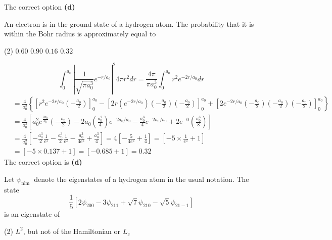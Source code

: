 \begin{enumerate}
\begin{answer}
	The correct option \textbf{(d)}	
\end{answer}
\begin{minipage}{\textwidth}
	\item An electron is in the ground state of a hydrogen atom. The probability that it is within the Bohr radius is approximately equal to
\end{minipage}
\begin{tasks}(2)
	\task[\textbf{A.}] $0.60$
	\task[\textbf{B.}] $0.90$
	\task[\textbf{C.}]$0.16$
	\task[\textbf{D.}]$0.32$
\end{tasks}
\begin{answer}
	$$\int_{0}^{a_{0}}\left|\frac{1}{\sqrt{\pi a_{0}^{3}}} e^{-r / a_{0}}\right|^{2} 4 \pi r^{2} d r=\frac{4 \pi}{\pi a_{0}^{3}} \int_{0}^{a_{0}} r^{2} e^{-2 r / a_{0}} d r$$	
	$\begin{aligned}
	&=\frac{4}{a_{0}^{3}}\left\{\left[r^{2} e^{-2 r / a_{0}}\left(-\frac{a_{0}}{2}\right)\right]_{0}^{a_{0}}-\left[2 r\left(e^{-2 r / a_{0}}\right)\left(-\frac{a_{0}}{2}\right)\left(-\frac{a_{0}}{2}\right)\right]_{0}^{a_{0}}+\left[2 e^{-2 r / a_{0}}\left(-\frac{a_{0}}{2}\right)\left(-\frac{a_{0}}{2}\right)\left(-\frac{a_{0}}{2}\right)\right]_{0}^{a_{0}}\right\} \\
	&=\frac{4}{a_{0}^{3}}\left[a_{0}^{2} e^{\frac{2 a_{0}}{a_{0}}}\left(-\frac{a_{0}}{2}\right)-2 a_{0}\left(\frac{a_{0}^{2}}{4}\right) e^{-2 a_{0} / a_{0}}-\frac{a_{0}^{3}}{4} e^{-2 a_{0} / a_{0}}+2 e^{-0}\left(\frac{a_{0}^{3}}{8}\right)\right] \\
	&=\frac{4}{a_{0}^{3}}\left[-\frac{a_{0}^{3}}{2} \frac{1}{e^{2}}-\frac{a_{0}^{3}}{2} \frac{1}{e^{2}}-\frac{a_{0}^{3}}{4 e^{2}}+\frac{a_{0}^{3}}{4}\right]=4\left[-\frac{5}{4 e^{2}}+\frac{1}{4}\right]=\left[-5 \times \frac{1}{e^{2}}+1\right] \\
	&=[-5 \times 0.137+1]=[-0.685+1]=0.32
	\end{aligned}$
	The correct option is \textbf{(d)}
\end{answer}
\begin{minipage}{\textwidth}
	\item Let $\psi_{\text {nlm }}$ denote the eigenstates of a hydrogen atom in the usual notation. The state
	$$
	\frac{1}{5}\left[2 \psi_{200}-3 \psi_{211}+\sqrt{7} \psi_{210}-\sqrt{5} \psi_{21-1}\right]
	$$
	is an eigenstate of
\end{minipage}
\begin{tasks}(2)
	\task[\textbf{A.}] $L^{2}$, but not of the Hamiltonian or $L_{z}$

\end{tasks}
\end{enumerate}

